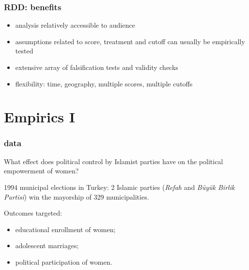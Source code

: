 \documentclass[12pt,english,dvipsnames,aspectratio=169,handout]{beamer}\usepackage[]{graphicx}\usepackage[]{xcolor}
\begin{document}
\begin{frame}
\frametitle{RDD: benefits}

\begin{itemize}
\setlength\itemsep{1.5em}
\item analysis relatively accessible to audience \pause
\item assumptions related to score, treatment and cutoff can usually be empirically tested \pause
\item extensive array of falsification tests and validity checks \pause
\item flexibility: time, geography, multiple scores, multiple cutoffs
\end{itemize}

\end{frame}


\section{Empirics I}

\begin{frame}
\frametitle{ data}

What effect does political control by Islamist parties have on the political empowerment of women?\bigskip
\pause

1994 municipal elections in Turkey: 2 Islamic parties (\textit{Refah} and \textit{B\"{u}y\"{u}k Birlik Partisi}) win the mayorship of 329 municipalities.\bigskip
\pause

Outcomes targeted:

\begin{itemize}
\item educational enrollment of women;
\item adolescent marriages;
\item political participation of women.
\end{itemize}

\end{frame}
\end{document}
